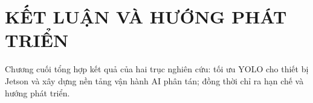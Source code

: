 \chapter{KẾT LUẬN VÀ HƯỚNG PHÁT TRIỂN}
\label{chap:ket-luan}

Chương cuối tổng hợp kết quả của hai trục nghiên cứu: tối ưu YOLO cho thiết bị
Jetson và xây dựng nền tảng vận hành AI phân tán; đồng thời chỉ ra hạn chế và
hướng phát triển.




